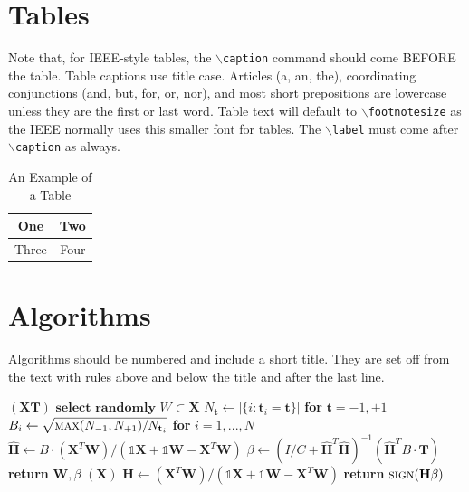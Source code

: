 \documentclass[lettersize,journal]{IEEEtran}
\begin{document}
 

\section{Tables}
Note that, for IEEE-style tables, the
 $\backslash${\tt{caption}} command should come BEFORE the table. Table captions use title case. Articles (a, an, the), coordinating conjunctions (and, but, for, or, nor), and most short prepositions are lowercase unless they are the first or last word. Table text will default to $\backslash${\tt{footnotesize}} as
 the IEEE normally uses this smaller font for tables.
 The $\backslash${\tt{label}} must come after $\backslash${\tt{caption}} as always.
 
\begin{table}[!t]
\caption{An Example of a Table\label{tab:table1}}
\centering
\begin{tabular}{|c||c|}
\hline
One & Two\\
\hline
Three & Four\\
\hline
\end{tabular}
\end{table}

\section{Algorithms}
Algorithms should be numbered and include a short title. They are set off from the text with rules above and below the title and after the last line.

\begin{algorithm}[H]
\caption{Weighted Tanimoto ELM.}\label{alg:alg1}
\begin{algorithmic}
\STATE 
{}$(\mathbf{X} \mathbf{T})$
\STATE \hspace{0.5cm}$ \textbf{select randomly } W \subset \mathbf{X}  $
\STATE \hspace{0.5cm}$ N_\mathbf{t} \gets | \{ i : \mathbf{t}_i = \mathbf{t} \} | $ \textbf{ for } $ \mathbf{t}= -1,+1 $
\STATE \hspace{0.5cm}$ B_i \gets \sqrt{ \textsc{max}(N_{-1},N_{+1}) / N_{\mathbf{t}_i} } $ \textbf{ for } $ i = 1,...,N $
\STATE \hspace{0.5cm}$ \hat{\mathbf{H}} \gets  B \cdot (\mathbf{X}^T\textbf{W})/( \mathbb{1}\mathbf{X} + \mathbb{1}\textbf{W} - \mathbf{X}^T\textbf{W} ) $
\STATE \hspace{0.5cm}$ \beta \gets \left ( I/C + \hat{\mathbf{H}}^T\hat{\mathbf{H}} \right )^{-1}(\hat{\mathbf{H}}^T B\cdot \mathbf{T})  $
\STATE \hspace{0.5cm}\textbf{return}  $\textbf{W},  \beta $
\STATE 
{}$(\mathbf{X} )$
\STATE \hspace{0.5cm}$ \mathbf{H} \gets  (\mathbf{X}^T\textbf{W} )/( \mathbb{1}\mathbf{X}  + \mathbb{1}\textbf{W}- \mathbf{X}^T\textbf{W}  ) $
\STATE \hspace{0.5cm}\textbf{return}  $\textsc{sign}( \mathbf{H} \beta )$
\end{algorithmic}
\label{alg2}
\end{algorithm}
\end{document}
